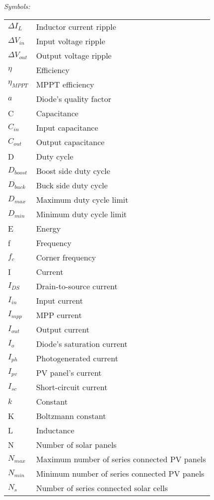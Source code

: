 \vspace{5mm} %
\newpage
\noindent\textit{Symbols:}\newline
\begin{tabular}{ll}
$\Delta I_{L}$ & Inductor current ripple\\
$\Delta V_{in}$ & Input voltage ripple\\
$\Delta V_{out}$ & Output voltage ripple\\
$\eta$ & Efficiency\\
$\eta_{MPPT}$ & MPPT efficiency\\
$a$ & Diode's quality factor \\
C & Capacitance\\
$C_{in}$ & Input capacitance\\
$C_{out}$ & Output capacitance\\
D & Duty cycle\\
$D_{boost}$ & Boost side duty cycle\\
$D_{buck}$ & Buck side duty cycle\\
$D_{max}$  & Maximum duty cycle limit \\
$D_{min}$  & Minimum duty cycle limit \\ 
E & Energy\\
f & Frequency\\
$f_{c}$ & Corner frequency \\
I & Current\\
$I_{DS}$ & Drain-to-source current \\
$I_{in}$ & Input current \\
$I_{mpp}$ & MPP current\\
$I_{out}$ & Output current \\
$I_{o}$ & Diode's saturation current \\
$I_{ph}$ & Photogenerated current \\
$I_{pv}$ & PV panel's current \\
$I_{sc}$ & Short-circuit current\\
$k$ & Constant \\
K & Boltzmann constant \\
L & Inductance\\
N & Number of solar panels \\
$N_{max}$ & Maximum number of series connected PV panels \\
$N_{min}$ & Minimum number of series connected PV panels \\
$N_{s}$ & Number of series connected solar cells \\ 

\end{tabular}

